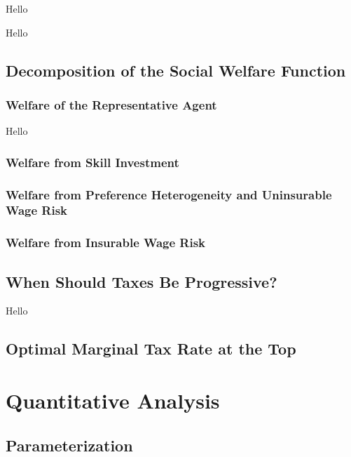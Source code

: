 \documentclass{article}
\begin{document}
{
\corollary Hello

}

{
\corollary Hello

}

\subsection{Decomposition of the Social Welfare Function}

\subsubsection{Welfare of the Representative Agent}

{
\proposition Hello

}

\subsubsection{Welfare from Skill Investment}

\subsubsection{Welfare from Preference Heterogeneity and Uninsurable Wage Risk}

\subsubsection{Welfare from Insurable Wage Risk}


\subsection{When Should Taxes Be Progressive?}

{
\proposition Hello

}

\subsection{Optimal Marginal Tax Rate at the Top}

\section{Quantitative Analysis}

\subsection{Parameterization}
\end{document}
